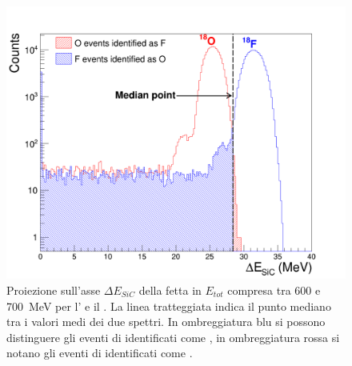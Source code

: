 \begin{figure} [!t]
	\centering
	\includegraphics[scale=0.28]{Grafici_Tesi/Contaminazione/contaminazione.png}
	\caption{Proiezione sull'asse $\Delta E_{SiC}$ della fetta in $E_{tot}$ compresa tra 600 e 700~MeV per l' e il . La linea tratteggiata indica il punto mediano tra i valori medi dei due spettri. In ombreggiatura blu si possono distinguere gli eventi di  identificati come , in ombreggiatura rossa si notano gli eventi di  identificati come .} \label{fig:fetta_con_contaminazione}
\end{figure}










